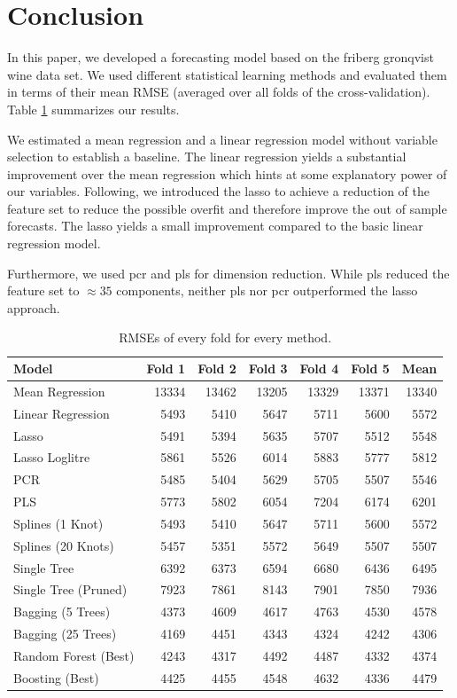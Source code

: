 \documentclass[11pt,]{article}
\begin{document}
\hypertarget{conclusion}{%
\section{Conclusion}\label{conclusion}}

In this paper, we developed a forecasting model based on the friberg
gronqvist wine data set. We used different statistical learning methods
and evaluated them in terms of their mean \ac{RMSE} (averaged over all
folds of the cross-validation). Table \ref{tab:RMSESum} summarizes our
results.

We estimated a mean regression and a linear regression model without
variable selection to establish a baseline. The linear regression yields
a substantial improvement over the mean regression which hints at some
explanatory power of our variables. Following, we introduced the
\ac{lasso} to achieve a reduction of the feature set to reduce the
possible overfit and therefore improve the out of sample forecasts. The
lasso yields a small improvement compared to the basic linear regression
model.

Furthermore, we used \ac{pcr} and \ac{pls} for dimension reduction.
While \ac{pls} reduced the feature set to \(\approx35\) components,
neither \ac{pls} nor \ac{pcr} outperformed the \ac{lasso} approach.

\begin{table}[t]

\caption{\label{tab:RMSE}\label{tab:RMSESum}RMSEs of every fold for every method.}
\centering
\begin{tabular}{lrrrrrr}
\toprule
Model & Fold 1 & Fold 2 & Fold 3 & Fold 4 & Fold 5 & Mean\\
\midrule
Mean Regression & 13334 & 13462 & 13205 & 13329 & 13371 & 13340\\
Linear Regression & 5493 & 5410 & 5647 & 5711 & 5600 & 5572\\
Lasso & 5491 & 5394 & 5635 & 5707 & 5512 & 5548\\
Lasso Loglitre & 5861 & 5526 & 6014 & 5883 & 5777 & 5812\\
PCR & 5485 & 5404 & 5629 & 5705 & 5507 & 5546\\
\addlinespace
PLS & 5773 & 5802 & 6054 & 7204 & 6174 & 6201\\
Splines (1 Knot) & 5493 & 5410 & 5647 & 5711 & 5600 & 5572\\
Splines (20 Knots) & 5457 & 5351 & 5572 & 5649 & 5507 & 5507\\
Single Tree & 6392 & 6373 & 6594 & 6680 & 6436 & 6495\\
Single Tree (Pruned) & 7923 & 7861 & 8143 & 7901 & 7850 & 7936\\
\addlinespace
Bagging (5 Trees) & 4373 & 4609 & 4617 & 4763 & 4530 & 4578\\
Bagging (25 Trees) & 4169 & 4451 & 4343 & 4324 & 4242 & 4306\\
Random Forest (Best) & 4243 & 4317 & 4492 & 4487 & 4332 & 4374\\
Boosting (Best) & 4425 & 4455 & 4548 & 4632 & 4336 & 4479\\
\bottomrule
\end{tabular}
\end{table}
\end{document}
